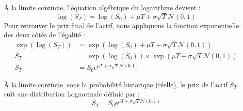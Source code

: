 À la limite continue, l'équation algébrique du logarithme devient :
\begin{equation}
    \label{eq:fsec3-log_st}
    \log(S_T) = \log(S_0) + \mu T + \sigma \sqrt{T} \mathcal{N}(0,1)
\end{equation}
Pour retrouver le prix final de l'actif, nous appliquons la fonction exponentielle des deux côtés de l'égalité :
\begin{equation}
    \label{eq:fsec3-st_lognormale}
\begin{aligned}
    \exp(\log(S_T)) &= \exp\left( \log(S_0) + \mu T + \sigma \sqrt{T} \mathcal{N}(0,1) \right) \\
    S_T &= \exp(\log(S_0)) \times \exp\left( \mu T + \sigma \sqrt{T} \mathcal{N}(0,1) \right) \\
    S_T &= S_0 e^{\mu T + \sigma \sqrt{T} \mathcal{N}(0,1)}
\end{aligned}
\end{equation}

\begin{theorembox}
À la limite continue, sous la probabilité historique (réelle), le prix de l'actif $S_T$ suit une distribution Lognormale définie par :
\begin{equation}
    \label{eq:fsec3-theoreme_lognormale}
    S_T = S_0 e^{\mu T + \sigma \sqrt{T} \mathcal{N}(0,1)}
\end{equation}
\end{theorembox}